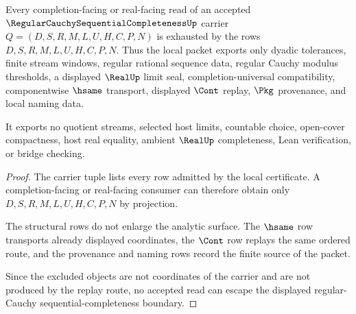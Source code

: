 \begin{theorem}
\label{thm:regular-cauchy-sequential-completeness-nonescape}
Every completion-facing or real-facing read of an accepted $\RegularCauchySequentialCompletenessUp$ carrier $Q=(D,S,R,M,L,U,H,C,P,N)$ is exhausted by the rows $D,S,R,M,L,U,H,C,P,N$. Thus the local packet exports only dyadic tolerances, finite stream windows, regular rational sequence data, regular Cauchy modulus thresholds, a displayed $\RealUp$ limit seal, completion-universal compatibility, componentwise $\hsame$ transport, displayed $\Cont$ replay, $\Pkg$ provenance, and local naming data.

It exports no quotient streams, selected host limits, countable choice, open-cover compactness, host real equality, ambient $\RealUp$ completeness, Lean verification, or bridge checking.
\end{theorem}
\begin{proof}
The carrier tuple lists every row admitted by the local certificate. A completion-facing or real-facing consumer can therefore obtain only $D,S,R,M,L,U,H,C,P,N$ by projection.

The structural rows do not enlarge the analytic surface. The $\hsame$ row transports already displayed coordinates, the $\Cont$ row replays the same ordered route, and the provenance and naming rows record the finite source of the packet.

Since the excluded objects are not coordinates of the carrier and are not produced by the replay route, no accepted read can escape the displayed regular-Cauchy sequential-completeness boundary.
\end{proof}

